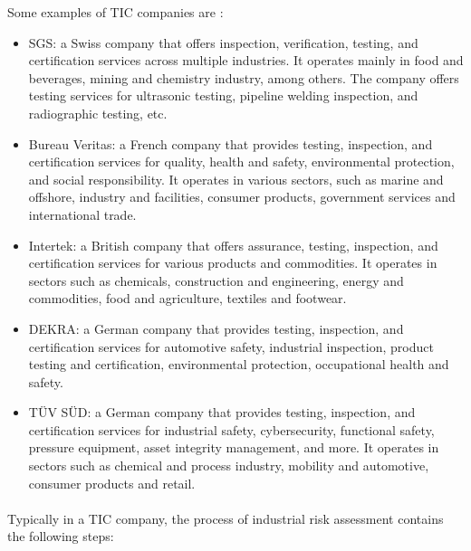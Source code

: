 \bigskip Some examples of TIC companies are \cite{tic}:
\begin{itemize}
    \item SGS: a Swiss company that offers inspection, verification, testing, and certification services across multiple industries. It operates mainly in food and beverages, mining and chemistry industry, among others. The company offers testing services for ultrasonic testing, pipeline welding inspection, and radiographic testing, etc.
    \item Bureau Veritas: a French company that provides testing, inspection, and certification services for quality, health and safety, environmental protection, and social responsibility. It operates in various sectors, such as marine and offshore, industry and facilities, consumer products, government services and international trade.
    \item Intertek: a British company that offers assurance, testing, inspection, and certification services for various products and commodities. It operates in sectors such as chemicals, construction and engineering, energy and commodities, food and agriculture, textiles and footwear.
    \item DEKRA: a German company that provides testing, inspection, and certification services for automotive safety, industrial inspection, product testing and certification, environmental protection, occupational health and safety.
    \item TÜV SÜD: a German company that provides testing, inspection, and certification services for industrial safety, cybersecurity, functional safety, pressure equipment, asset integrity management, and more. It operates in sectors such as chemical and process industry, mobility and automotive, consumer products and retail.
\end{itemize}

\paragraph{} Typically in a TIC company, the process of industrial risk assessment contains the following steps:


